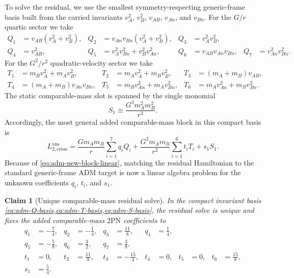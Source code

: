 \documentclass[11pt]{article}
\newcommand{\TwoPN}{\mathrm{2PN}}
\newcommand{\ADM}{\mathrm{ADM}}
\newtheorem{claim}{Claim}
\begin{document}
To solve the residual, we use the smallest symmetry-respecting generic-frame basis built
from the carried invariants
\(v_A^2\), \(v_B^2\), \(v_{AB}\), \(v_{An}\), and \(v_{Bn}\).  For the
\(G/r\) quartic sector we take
\begin{align}
Q_1&=v_{AB}(v_A^2+v_B^2),
&
Q_2&=v_{An}v_{Bn}(v_A^2+v_B^2),
&
Q_3&=v_A^2v_B^2,
\nonumber\\
Q_4&=v_{AB}^2,
&
Q_5&=v_A^2v_{Bn}^2+v_B^2v_{An}^2,
&
Q_6&=v_{AB}v_{An}v_{Bn},
&
Q_7&=v_{An}^2v_{Bn}^2.
\label{eq:adm-Q-basis}
\end{align}
For the \(G^2/r^2\) quadratic-velocity sector we take
\begin{align}
T_1&=m_B v_A^2+m_A v_B^2,
&
T_2&=m_A v_A^2+m_B v_B^2,
&
T_3&=(m_A+m_B)v_{AB},
\nonumber\\
T_4&=(m_A+m_B)v_{An}v_{Bn},
&
T_5&=m_B v_{An}^2+m_A v_{Bn}^2,
&
T_6&=m_A v_{An}^2+m_B v_{Bn}^2.
\label{eq:adm-T-basis}
\end{align}
The static comparable-mass slot is spanned by the single monomial
\begin{equation}
S_1\equiv \frac{G^3 m_A^2 m_B^2}{r^3}.
\label{eq:adm-S-basis}
\end{equation}
Accordingly, the most general added comparable-mass block in this compact basis is
\begin{equation}
L_{2,\mathrm{cross}}^{\mathrm{ans}}
=\frac{Gm_A m_B}{r}\sum_{i=1}^{7} q_i Q_i
+\frac{G^2m_A m_B}{r^2}\sum_{i=1}^{6} t_i T_i
+s_1 S_1.
\label{eq:adm-cross-ansatz}
\end{equation}
Because of \cref{eq:adm-new-block-linear}, matching the residual Hamiltonian to the
standard generic-frame \(\ADM\) target is now a linear algebra problem for the unknown
coefficients \(q_i\), \(t_i\), and \(s_1\).

\begin{claim}[Unique comparable-mass residual solve]
\label{clm:adm-solve}
In the compact invariant basis
\cref{eq:adm-Q-basis,eq:adm-T-basis,eq:adm-S-basis}, the residual solve is unique and
fixes the added comparable-mass \(\TwoPN\) coefficients to
\begin{align}
q_1&=-\frac74,
& q_2&=-\frac14,
& q_3&=\frac{11}{8},
& q_4&=\frac14,
\nonumber\\
q_5&=-\frac58,
& q_6&=\frac32,
& q_7&=\frac38,
\label{eq:adm-q-solution}
\\[0.5ex]
t_1&=0,
& t_2&=\frac{11}{8},
& t_3&=-\frac{15}{4},
& t_4&=0,
& t_5&=0,
& t_6&=\frac{15}{8},
\label{eq:adm-t-solution}
\\[0.5ex]
s_1&=\frac54.
\label{eq:adm-s-solution}
\end{align}
\end{claim}
\end{document}

